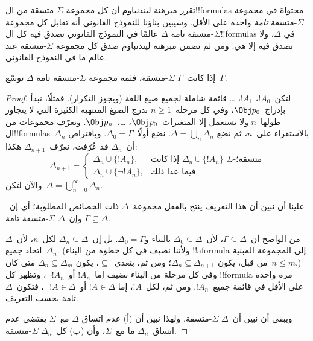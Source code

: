 \documentclass[../../../include/open-logic-section]{subfiles}
\begin{document}


تقرر مبرهنة ليندنباوم أن كل مجموعة $\Sigma$-متسقة من ال!!{formula}s
محتواة في مجموعة $\Sigma$-متسقة \emph{تامة} واحدة على الأقل. وسيبين
بناؤنا للنموذج القانوني أنه تقابل كل مجموعة $\Sigma$-متسقة تامة
$\Delta$ عالمًا في النموذج القانوني تصدق فيه كل ال!!{formula}s في
$\Delta$، ولا تصدق فيه إلا هي. ومن ثم تضمن مبرهنة ليندنباوم صدق كل
مجموعة $\Sigma$-متسقة عند عالم ما في النموذج القانوني.

\begin{thm}
  إذا كانت~$\Gamma$ $\Sigma$-متسقة، فثمة مجموعة $\Sigma$-متسقة تامة
  $\Delta$ توسّع~$\Gamma$.
\end{thm}

\begin{proof}
لتكن~$!A_0$، $!A_1$، \dots{} قائمة شاملة لجميع صيغ اللغة (ويجوز
التكرار). فمثلًا، نبدأ بإدراج~$\Obj p_0$، وفي كل مرحلة~$n \ge 1$
ندرج الصيغ المنتهية الكثيرة التي لا يتجاوز طولها~$n$ ولا تستعمل إلا
المتغيرات~$\Obj p_0$، \dots،~$\Obj p_n$. ونعرّف مجموعات من
ال!!{formula}s~$\Delta_n$ بالاستقراء على~$n$، ثم نضع
$\Delta = \bigcup_n \Delta_n$. نضع أولًا~$\Delta_0 = \Gamma$.
وبافتراض أن~$\Delta_n$ قد عُرّفت، نعرّف~$\Delta_{n+1}$ هكذا:
\[
\Delta_{n+1} =
\begin{cases}
  \Delta_n \cup \{!A_n\}, & \text{إذا كانت $\Delta_n \cup \{!A_n\}$
    $\Sigma$-متسقة؛} \\
  \Delta_n \cup \{\lnot !A_n\}, & \text{فيما عدا ذلك.}
\end{cases}
\]
والآن لتكن~$\Delta = \bigcup_{n=0}^\infty \Delta_n$.

علينا أن نبين أن هذا التعريف ينتج بالفعل مجموعة~$\Delta$ ذات الخصائص
المطلوبة؛ أي إن~$\Gamma \subseteq \Delta$ وإن~$\Delta$ $\Sigma$-متسقة
تامة.

من الواضح أن~$\Gamma \subseteq \Delta$، لأن~$\Delta_0 \subseteq
\Delta$ بالبناء و$\Delta_0 = \Gamma$. بل إن~$\Delta_n \subseteq
\Delta$ لكل~$n$، لأن~$\Delta$ اتحاد جميع~$\Delta_n$. (ولأننا نضيف في
كل خطوة من البناء !!a{formula} إلى المجموعة المبنية من قبل، يكون
$\Delta_n \subseteq \Delta_{n+1}$؛ ومن ثم، بتعدي~$\subseteq$، يكون
$\Delta_n \subseteq \Delta_m$ متى كان~$n \le m$.) وفي كل مرحلة من
البناء نضيف إما~$!A_n$ أو~$\lnot !A_n$، وتظهر كل !!{formula} مرة واحدة
على الأقل في قائمة جميع~$!A_n$. ومن ثم، لكل~$!A$، إما
$!A \in \Delta$ أو~$\lnot !A \in \Delta$، فتكون~$\Delta$ تامة بحسب
التعريف.

ويبقى أن نبين أن~$\Delta$ $\Sigma$-متسقة. ولهذا نبين أن (أ) عدم اتساق
$\Delta$ مع~$\Sigma$ يقتضي عدم اتساق~$\Delta_n$ ما مع~$\Sigma$، وأن
(ب) كل~$\Delta_n$ $\Sigma$-متسقة.


\end{proof}
\end{document}
